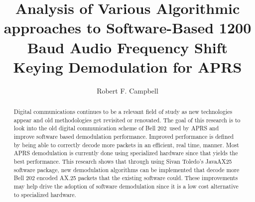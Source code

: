 \documentclass[12pt]{ucthesis}
\begin{document}
\title{Analysis of Various Algorithmic approaches to Software-Based 1200 Baud Audio Frequency Shift Keying Demodulation for APRS}
\author{Robert F. Campbell}
  
 
     
\maketitle

\begin{frontmatter}

\copyrightpage

\committeemembershippage

\begin{abstract}
Digital communications continues to be a relevant field of study as new technologies appear and old methodologies get revisited or renovated. The goal of this research is to look into the old digital communication scheme of Bell 202\,\cite{stauffer1984fsk} used by APRS and improve software based demodulation performance. Improved performance is defined by being able to correctly decode more packets in an efficient, real time, manner. Most APRS demodulation is currently done using specialized hardware since that yields the best performance. This research shows that through using Sivan Toledo's JavaAX25\,\cite{javax25github} software package, new demodulation algorithms can be implemented that decode more Bell 202 encoded AX.25 packets that the existing software could. These improvements may help drive the adoption of software demodulation since it is a low cost alternative to specialized hardware.
\end{abstract}


\tableofcontents
\listoftables
\listoffigures

\end{frontmatter}















\end{document}
